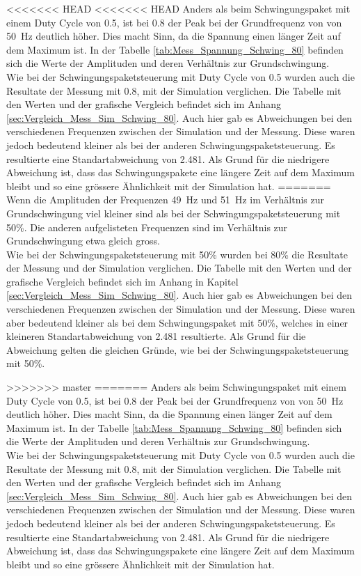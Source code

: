 <<<<<<< HEAD
<<<<<<< HEAD
Anders als beim Schwingungspaket mit einem Duty Cycle von 0.5, ist bei 0.8 der Peak bei der Grundfrequenz von von \SI{50}{Hz} deutlich höher. Dies macht Sinn, da die Spannung einen länger Zeit auf dem Maximum ist.
In der Tabelle \ref{tab:Mess_Spannung_Schwing_80} befinden sich die Werte der Amplituden und deren Verhältnis zur Grundschwingung.\\
Wie bei der Schwingungspaketsteuerung mit Duty Cycle von 0.5 wurden auch die Resultate der Messung mit 0.8, mit der Simulation verglichen. Die Tabelle mit den Werten und der grafische Vergleich befindet sich im Anhang \ref{sec:Vergleich_Mess_Sim_Schwing_80}. Auch hier gab es Abweichungen bei den verschiedenen Frequenzen zwischen der Simulation und der Messung. Diese waren jedoch bedeutend kleiner als bei der anderen Schwingungspaketsteuerung. Es resultierte eine Standartabweichung von 2.481. Als Grund für die niedrigere Abweichung ist, dass das Schwingungspakete eine längere Zeit auf dem Maximum bleibt und so eine grössere Ähnlichkeit mit der Simulation hat.
=======
Wenn die Amplituden der Frequenzen \SI{49}{Hz} und \SI{51}{Hz} im Verhältnis zur Grundschwingung viel kleiner sind als bei der Schwingungspaketsteuerung mit 50\%. Die anderen aufgelisteten Frequenzen sind im Verhältnis zur Grundschwingung etwa gleich gross.\\


Wie bei der Schwingungspaketsteuerung mit 50\% wurden bei 80\% die Resultate der Messung und der Simulation verglichen. Die Tabelle mit den Werten und der grafische Vergleich befindet sich im Anhang in Kapitel \ref{sec:Vergleich_Mess_Sim_Schwing_80}. Auch hier gab es Abweichungen bei den verschiedenen Frequenzen zwischen der Simulation und der Messung. Diese waren aber bedeutend kleiner als bei dem Schwingungspaket mit 50\%, welches in einer kleineren Standartabweichung von 2.481 resultierte. Als Grund für die Abweichung gelten die gleichen Gründe, wie bei der Schwingungspaketsteuerung mit 50\%.

>>>>>>> master
=======
Anders als beim Schwingungspaket mit einem Duty Cycle von 0.5, ist bei 0.8 der Peak bei der Grundfrequenz von von \SI{50}{Hz} deutlich höher. Dies macht Sinn, da die Spannung einen länger Zeit auf dem Maximum ist.
In der Tabelle \ref{tab:Mess_Spannung_Schwing_80} befinden sich die Werte der Amplituden und deren Verhältnis zur Grundschwingung.\\
Wie bei der Schwingungspaketsteuerung mit Duty Cycle von 0.5 wurden auch die Resultate der Messung mit 0.8, mit der Simulation verglichen. Die Tabelle mit den Werten und der grafische Vergleich befindet sich im Anhang \ref{sec:Vergleich_Mess_Sim_Schwing_80}. Auch hier gab es Abweichungen bei den verschiedenen Frequenzen zwischen der Simulation und der Messung. Diese waren jedoch bedeutend kleiner als bei der anderen Schwingungspaketsteuerung. Es resultierte eine Standartabweichung von 2.481. Als Grund für die niedrigere Abweichung ist, dass das Schwingungspakete eine längere Zeit auf dem Maximum bleibt und so eine grössere Ähnlichkeit mit der Simulation hat.

